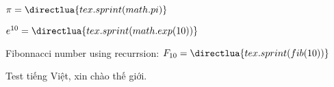 \documentclass{article}
\begin{document}
	$\pi = \directlua{tex.sprint(math.pi)}$\par
	$e^{10} = \directlua{tex.sprint(math.exp(10))}$\par
	Fibonnacci number using recurrsion: $F_{10} = \directlua{tex.sprint(fib(10))}$
	
	Test tiếng Việt, xin chào thế giới.
\end{document}
